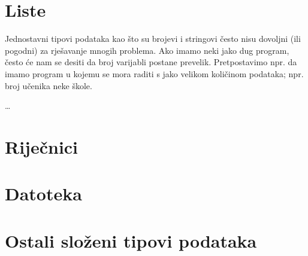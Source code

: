 \section{Liste}

Jednostavni tipovi podataka kao što su brojevi i stringovi
često nisu dovoljni (ili pogodni) za rješavanje mnogih
problema. Ako imamo neki jako dug program, često će nam se
desiti da broj varijabli postane prevelik. Pretpostavimo npr. da
imamo program u kojemu se mora raditi s jako velikom količinom
podataka; npr. broj učenika neke škole.

\dots

\section{Riječnici}

\section{Datoteka}

\section{Ostali složeni tipovi podataka}
